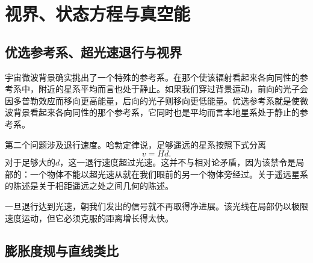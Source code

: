 \chapter{视界、状态方程与真空能}

\section{优选参考系、超光速退行与视界}

宇宙微波背景确实挑出了一个特殊的参考系。在那个使该辐射看起来各向同性的参考系中，附近的星系平均而言也处于静止。如果我们穿过背景运动，前向的光子会因多普勒效应而移向更高能量，后向的光子则移向更低能量。优选参考系就是使微波背景看起来各向同性的那个参考系，它同时也是平均而言本地星系处于静止的参考系。

\begin{classroomqa}
\end{classroomqa}

第二个问题涉及退行速度。哈勃定律说，足够遥远的星系按照下式分离
\begin{equation}
v = H d .
\end{equation}
对于足够大的\(d\)，这一退行速度超过光速。这并不与相对论矛盾，因为该禁令是局部的：一个物体不能以超光速从就在我们眼前的另一个物体旁经过。关于遥远星系的陈述是关于相距遥远之处之间几何的陈述。

\begin{classroomqa}
\end{classroomqa}

一旦退行达到光速，朝我们发出的信号就不再取得净进展。该光线在局部仍以极限速度运动，但它必须克服的距离增长得太快。

\begin{classroomqa}
\end{classroomqa}

\section{膨胀度规与直线类比}


